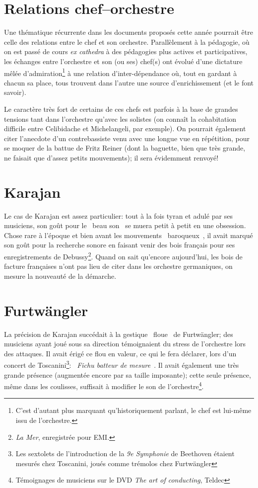 \section*{Relations chef--orchestre}
Une thématique récurrente dans les documents proposés cette année pourrait être celle des relations entre le chef et son orchestre. Parallèlement à la pédagogie, où on est passé de cours \emph{ex cathedra} à des pédagogies plus actives et participatives, les échanges entre l'orchestre et son (ou ses) chef(s) ont évolué d'une dictature mêlée d'admiration\footnote{C'est d'autant plus marquant qu'historiquement parlant, le chef est lui-même issu de l'orchestre.} à une relation d'inter-dépendance où, tout en gardant à chacun sa place, tous trouvent dans l'autre une source d'enrichissement (et le font savoir).

Le caractère très fort de certains de ces chefs est parfois à la base de grandes tensions tant dans l'orchestre qu'avec les solistes (on connaît la cohabitation difficile entre Celibidache et Michelangeli, par exemple). On pourrait également citer l'anecdote d'un contrebassiste venu avec une longue vue en répétition, pour se moquer de la battue de Fritz Reiner (dont la baguette, bien que très grande, ne faisait que d'assez petits mouvements); il sera évidemment renvoyé!

\section*{Karajan}
Le cas de Karajan est assez particulier: tout à la fois tyran et adulé par ses musiciens, son goût pour le \og~beau son~\fg{} se muera petit à petit en une obsession. Chose rare à l'époque et bien avant les mouvements \og{}~baroqueux~\fg{}, il avait marqué son goût pour la recherche sonore en faisant venir des bois français pour ses enregistrements de Debussy\footnote{\emph{La Mer}, enregistrée pour EMI.}. Quand on sait qu'encore aujourd'hui, les bois de facture françaises n'ont pas lieu de citer dans les orchestre germaniques, on mesure la nouveauté de la démarche.


\section*{Furtwängler}
La précision de Karajan succédait à la gestique \og{}~floue~\fg{} de Furtwängler; des musiciens ayant joué sous sa direction témoignaient du stress de l'orchestre lors des attaques. Il avait érigé ce flou en valeur, ce qui le fera déclarer, lors d'un concert de Toscanini\footnote{Les sextolets de l'introduction de la \emph{9e Symphonie} de Beethoven étaient mesurés chez Toscanini, joués comme trémolos chez Furtwängler}: \og~{}\emph{Fichu batteur de mesure}~\fg{}. Il avait également une très grande présence (augmentée encore par sa taille imposante); cette seule présence, même dans les coulisses, suffisait à modifier le son de l'orchestre\footnote{Témoignages de musiciens sur le DVD \emph{The art of conducting}, Teldec}.

